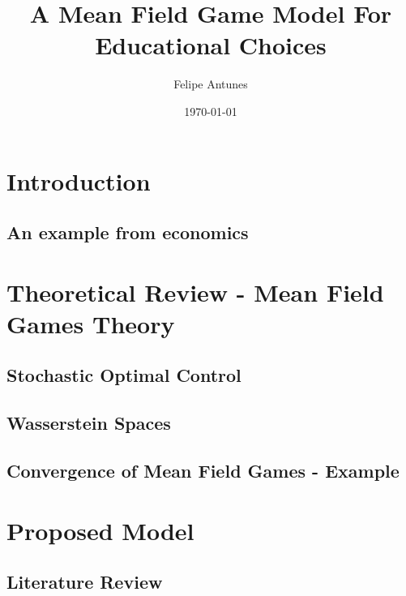 \documentclass{article}
\title{A Mean Field Game Model For Educational Choices}
\author{Felipe Antunes}
\date{\today}
\begin{document}
\maketitle


\section{Introduction}


\subsection{An example from economics}


\section{Theoretical Review - Mean Field Games Theory}


\subsection{Stochastic Optimal Control}\label{theo_review:soc}



\subsection{Wasserstein Spaces}\label{theo_review:wass}


\subsection{Convergence of Mean Field Games - Example}\label{theo_review:mfg_convergence}



\section{Proposed Model}\label{model_proposal}

\subsection{Literature Review}\label{model_proposal:motivation}
\end{document}
